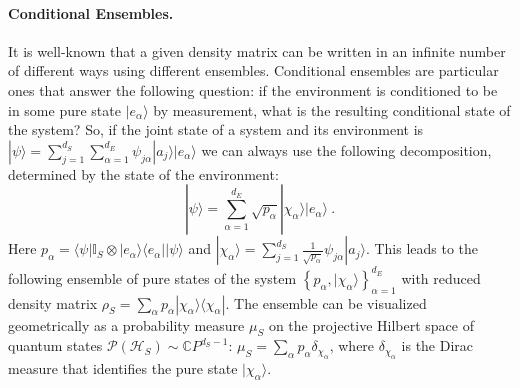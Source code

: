 \documentclass[a4paper,11pt,accepted=2024-09-14]{quantumarticle}
\newcommand{\bra}[1]    {\langle #1|}
\newcommand{\ket}[1]    {| #1 \rangle}
\newcommand{\PH}    {\mathcal{P}\left( \mc{H}\right)}
\newcommand{\+}         {\dagger}
\newcommand{\mc}[1]{\mathcal{#1}}
\begin{document}
\paragraph{{Conditional Ensembles}.} {It is well-known that a given density matrix can be written in an infinite number of different ways using different ensembles. Conditional ensembles \cite{fabioGQ1,fabioGQ2, fabioGQ3, anza2024maximum} are particular ones that answer the following question: if the environment is conditioned to be in some pure state $\ket{e_\alpha}$ by measurement, what is the resulting conditional state of the system? So, if the joint state of a system and its environment is $\ket{\psi} = \sum_{j=1}^{d_S}\sum_{\alpha=1}^{d_E}\psi_{j\alpha}\ket{a_j}\ket{e_\alpha}$} we can always use the following decomposition, determined by the state of the environment:
\begin{equation}
\ket{\psi}=\sum_{\alpha=1}^{d_E}\sqrt{p_\alpha} \ket{\chi_\alpha}\ket{e_\alpha}~.
\end{equation}
Here $p_\alpha = \bra{\psi}\mathbb{I}_S \otimes \ket{e_\alpha}\bra{e_\alpha} \ket{\psi}$ and $\ket{\chi_\alpha}=\sum_{j=1}^{d_S}\frac{1}{\sqrt{p_\alpha}}\psi_{j\alpha}\ket{a_j}$. This leads to the following ensemble of pure states of the system $\left\{p_\alpha,\ket{\chi_\alpha}\right\}_{\alpha=1}^{d_E}$ with reduced density matrix $\rho_S = \sum_\alpha p_\alpha \ket{\chi_\alpha}\bra{\chi_\alpha}$. The ensemble can be visualized geometrically as a probability measure $\mu_S$ on the projective Hilbert space of quantum states $\mathcal{P}(\mathcal{H}_S)\sim \mathbb{C}P^{d_S-1}$: $\mu_S = \sum_\alpha p_\alpha \delta_{\chi_\alpha}$, where $\delta_{\chi_\alpha}$ is the Dirac measure that identifies the pure state $\ket{\chi_\alpha}$.



\end{document}
